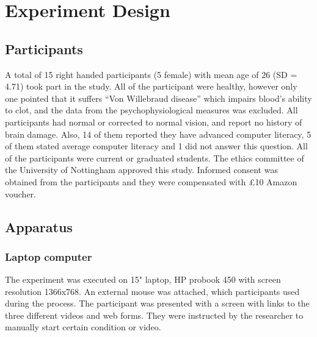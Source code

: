 \documentclass[../main/Feedback.tex]{subfiles}
\begin{document}
\section{Experiment Design}

\subsection{Participants}
A total of 15 right handed participants (5 female) with mean age of 26 (SD = 4.71) took part in the study. All of the participant were healthy, however only one pointed that it suffers ``Von Willebraud disease'' which impairs blood's ability to clot, and the data from the psychophysiological measures was excluded. All participants had normal or corrected to normal vision, and report no history of brain damage. Also, 14 of them reported they have advanced computer literacy, 5 of them stated average computer literacy and 1 did not answer this question. All of the participants were current or graduated students. The ethics committee of the University of Nottingham approved this study. Informed consent was obtained from the participants and they were compensated with £10 Amazon voucher.
\subsection{Apparatus}
\subsubsection{Laptop computer}
The experiment was executed on 15" laptop, HP probook 450 with screen resolution 1366x768. An external mouse was attached, which participants used during the process. The participant was presented with a screen with links to the three different videos and web forms. They were instructed by the researcher to manually start certain condition or video. 
\end{document}
